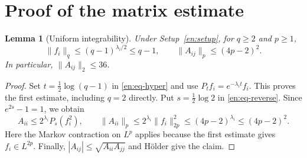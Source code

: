 \documentclass[12pt]{amsart}
\newtheorem{lem}[thm]{Lemma}
\theoremstyle{definition}
\theoremstyle{remark}
\numberwithin{equation}{section}
\theoremstyle{jpplain}
\begin{document}
\section{Proof of the matrix estimate}

\begin{lem}[Uniform integrability]\label{en:lem-moments}
Under Setup~\ref{en:setup}, for $q\geq2$ and $p\geq1$,
\begin{equation}\label{en:eq-integrability}
 \|f_i\|_q\leq(q-1)^{\lambda_i/2}\leq q-1,
 \qquad \|A_{ij}\|_p\leq(4p-2)^2.
\end{equation}
In particular, $\|A_{ij}\|_2\leq36$.
\end{lem}
\begin{proof}
Set $t=\frac12\log(q-1)$ in \eqref{en:eq-hyper} and use
$P_tf_i=e^{-\lambda_i t}f_i$.  This proves the first estimate, including
$q=2$ directly.  Put $s=\frac12\log2$ in
\eqref{en:eq-reverse}.  Since $e^{2s}-1=1$, we obtain
\[
 A_{ii}\leq2^{\lambda_i}P_s(f_i^2),\qquad
 \|A_{ii}\|_p\leq2^{\lambda_i}\|f_i\|_{2p}^2
             \leq(4p-2)^{\lambda_i}\leq(4p-2)^2.
\]
Here the Markov contraction on $L^p$ applies because the first estimate
gives $f_i\in L^{2p}$.  Finally,
$|A_{ij}|\leq\sqrt{A_{ii}A_{jj}}$ and Hölder give the claim.
\end{proof}
\end{document}
